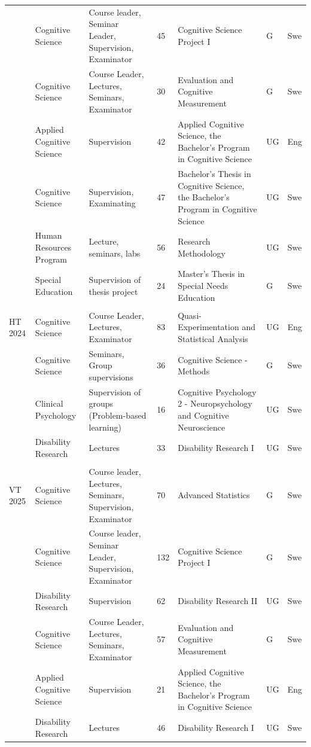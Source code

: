\documentclass[]{article}
\begin{document}
\begin{landscape}
\begin{ThreePartTable}
\begin{longtable}[t]{l>{\raggedright\arraybackslash}p{5cm}>{\raggedright\arraybackslash}p{5cm}l>{\raggedright\arraybackslash}p{5cm}ll}
 & Cognitive Science & Course leader, Seminar Leader, Supervision, Examinator & 45 & Cognitive Science Project I & G & Swe\\
 & Cognitive Science & Course Leader, Lectures, Seminars, Examinator & 30 & Evaluation and Cognitive Measurement & G & Swe\\
\addlinespace
 & Applied Cognitive Science & Supervision & 42 & Applied Cognitive Science, the Bachelor's Program in Cognitive Science & UG & Eng\\
 & Cognitive Science & Supervision, Examinating & 47 & Bachelor's Thesis in Cognitive Science, the Bachelor's Program in Cognitive Science & UG & Swe\\
 & Human Resources Program & Lecture, seminars, labs & 56 & Research Methodology & UG & Swe\\
 & Special Education & Supervision of thesis project & 24 & Master's Thesis in Special Needs Education & G & Swe\\
 &  &  &  &  &  \vphantom{1} & \\
\addlinespace
HT 2024 & Cognitive Science & Course Leader, Lectures, Examinator & 83 & Quasi-Experimentation and Statistical Analysis & UG & Eng\\
 & Cognitive Science & Seminars, Group supervisions & 36 & Cognitive Science - Methods & G & Swe\\
 & Clinical Psychology & Supervision of groups (Problem-based learning) & 16 & Cognitive Psychology 2 - Neuropsychology and Cognitive Neuroscience & UG & Swe\\
 & Disability Research & Lectures & 33 & Disability Research I & UG & Swe\\
 &  &  &  &  &  & \\
\addlinespace
VT 2025 & Cognitive Science & Course leader, Lectures, Seminars, Supervision, Examinator & 70 & Advanced Statistics & G & Swe\\
 & Cognitive Science & Course leader, Seminar Leader, Supervision, Examinator & 132 & Cognitive Science Project I & G & Swe\\
 & Disability Research & Supervision & 62 & Disability Research II & UG & Swe\\
 & Cognitive Science & Course Leader, Lectures, Seminars, Examinator & 57 & Evaluation and Cognitive Measurement & G & Swe\\
 & Applied Cognitive Science & Supervision & 21 & Applied Cognitive Science, the Bachelor's Program in Cognitive Science & UG & Eng\\
\addlinespace
 & Disability Research & Lectures & 46 & Disability Research I & UG & Swe\\

\end{longtable}
\end{ThreePartTable}
\end{landscape}
\end{document}
